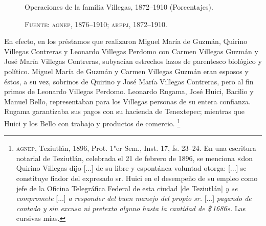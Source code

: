 \documentclass[14pt,twoside,final]{extbook} %
\let\oldfootnote\footnote
\renewcommand\footnote[1]{%
\oldfootnote{\hspace{1mm}#1}}
\begin{document}
\begin{figure}
\centering
\caption[Operaciones de la familia Villegas, 1872--1910 (Porcentajes)]{Operaciones de la familia Villegas, 1872--1910 (Porcentajes).}
\caption*{\textsc{Fuente:} \textsc{agnep}, 1876--1910; \textsc{arppj}, 1872--1910.}
\label{fig:porcentajes}
\end{figure}

En efecto, en los préstamos que realizaron Miguel María de Guzmán, Quirino Villegas Contreras y Leonardo Villegas Perdomo con Carmen Villegas Guzmán y José María Villegas Contreras, subyacían estrechos lazos de parentesco biológico y político. Miguel María de Guzmán y Carmen Villegas Guzmán eran esposos y éstos, a su vez, sobrinos de Quirino y José María Villegas Contreras, pero al fin primos de Leonardo Villegas Perdomo. Leonardo Rugama, José Huici, Bacilio y Manuel Bello, representaban para los Villegas personas de su entera confianza. Rugama garantizaba sus pagos con su hacienda de Tenextepec; mientras que Huici y los Bello con trabajo y productos de comercio.\footnote{\textsc{agnep}, Teziutlán, 1896, Prot. 1"er Sem., Inst. 17, fs. 23--24. En una escritura notarial de Teziutlán,\index[lugares]{Teziutlan@Teziutlán} celebrada el 21 de febrero de 1896, se menciona «don Quirino Villegas dijo [...] de su libre y espontánea voluntad otorga: [...] se constituye fiador del expresado sr. Huici en el desempeño de su empleo como jefe de la Oficina Telegráfica Federal de esta ciudad [de Teziutlán] \emph{y se compromete} [...] \emph{a responder del buen manejo del propio sr.} [...] \emph{pagando de contado y sin excusa ni pretexto alguno hasta la cantidad de \$\,1686}». Las cursivas mías.}
\end{document}
